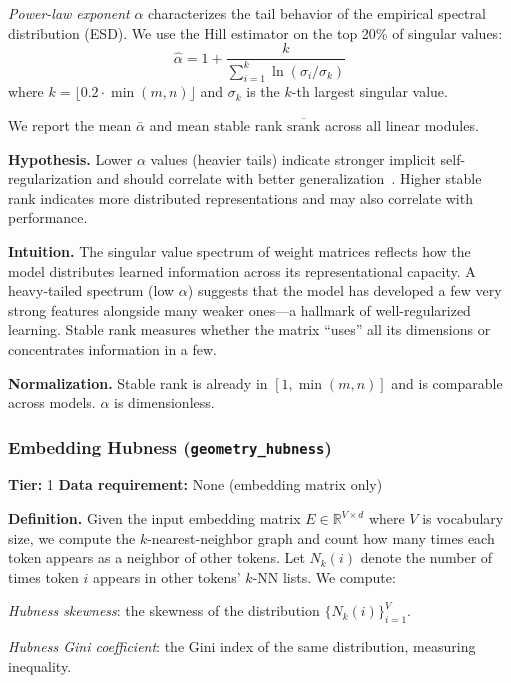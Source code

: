 \documentclass[preprint]{neurips_2025}
\begin{document}
\emph{Power-law exponent} $\alpha$ characterizes the tail behavior of the empirical spectral distribution (ESD). We use the Hill estimator on the top 20\% of singular values:
\begin{equation}
  \hat\alpha = 1 + \frac{k}{\sum_{i=1}^{k} \ln(\sigma_i / \sigma_k)}
\end{equation}
where $k = \lfloor 0.2 \cdot \min(m,n) \rfloor$ and $\sigma_k$ is the $k$-th largest singular value.

We report the mean $\bar\alpha$ and mean stable rank $\overline{\text{srank}}$ across all linear modules.

\textbf{Hypothesis.}
Lower $\alpha$ values (heavier tails) indicate stronger implicit self-regularization and should correlate with better generalization~\citep{martin2021implicit}. Higher stable rank indicates more distributed representations and may also correlate with performance.

\textbf{Intuition.}
The singular value spectrum of weight matrices reflects how the model distributes learned information across its representational capacity. A heavy-tailed spectrum (low $\alpha$) suggests that the model has developed a few very strong features alongside many weaker ones---a hallmark of well-regularized learning. Stable rank measures whether the matrix ``uses'' all its dimensions or concentrates information in a few.

\textbf{Normalization.} Stable rank is already in $[1, \min(m,n)]$ and is comparable across models. $\alpha$ is dimensionless.

\subsubsection{Embedding Hubness (\texttt{geometry\_hubness})}
\label{app:hubness}

\textbf{Tier:} 1 \quad \textbf{Data requirement:} None (embedding matrix only)

\textbf{Definition.}
Given the input embedding matrix $E \in \mathbb{R}^{V \times d}$ where $V$ is vocabulary size, we compute the $k$-nearest-neighbor graph and count how many times each token appears as a neighbor of other tokens. Let $N_k(i)$ denote the number of times token $i$ appears in other tokens' $k$-NN lists. We compute:

\emph{Hubness skewness}: the skewness of the distribution $\{N_k(i)\}_{i=1}^{V}$.

\emph{Hubness Gini coefficient}: the Gini index of the same distribution, measuring inequality.
\end{document}
